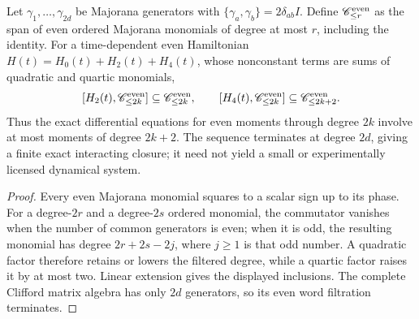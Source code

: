 \documentclass[12pt,a4paper]{article}
\begin{document}
\begin{theorem}
\label{p4b:thm:v347-majorana-hierarchy}
Let \(\gamma_1,\ldots,\gamma_{2d}\) be Majorana generators with
\(\{\gamma_a,\gamma_b\}=2\delta_{ab}I\).  Define
\(\mathscr C_{\le r}^{\rm even}\) as the span of even ordered
Majorana monomials of degree at most \(r\), including the identity.
For a time-dependent even Hamiltonian
\(H(t)=H_0(t)+H_2(t)+H_4(t)\), whose nonconstant terms are sums of
quadratic and quartic monomials,
\[
 [H_2(t),\mathscr C_{\le2k}^{\rm even}]
 \subseteq\mathscr C_{\le2k}^{\rm even},\qquad
 [H_4(t),\mathscr C_{\le2k}^{\rm even}]
 \subseteq\mathscr C_{\le2k+2}^{\rm even}.
\]
Thus the exact differential equations for even moments through degree
\(2k\) involve at most moments of degree \(2k+2\).  The sequence
terminates at degree \(2d\), giving a finite exact interacting closure;
it need not yield a small or experimentally licensed dynamical system.
\end{theorem}
\begin{proof}
Every even Majorana monomial squares to a scalar sign up to its phase.
For a degree-\(2r\) and a degree-\(2s\) ordered monomial, the
commutator vanishes when the number of common generators is even; when
it is odd, the resulting monomial has degree \(2r+2s-2j\), where
\(j\ge1\) is that odd number.  A quadratic factor therefore retains
or lowers the filtered degree, while a quartic factor raises it by at
most two.  Linear extension gives the displayed inclusions.  The
complete Clifford matrix algebra has only \(2d\) generators, so its
even word filtration terminates.
\end{proof}
\end{document}
